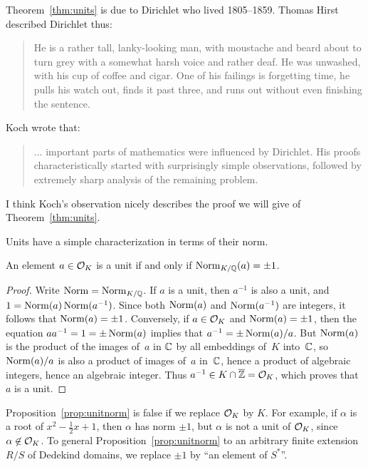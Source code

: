 \begin{remark}
Theorem~\ref{thm:units} is due to Dirichlet  who lived 1805--1859.
Thomas Hirst described Dirichlet thus:
\begin{quote}He is a rather tall,
lanky-looking man, with moustache and beard about
to turn grey with a somewhat harsh voice and rather deaf. He was
unwashed, with his cup of coffee and cigar. One of his failings is
forgetting time, he pulls his watch out, finds it past three, and runs
out without even finishing the sentence.
\end{quote}
Koch wrote that:
\begin{quote}
... important parts of mathematics were influenced by Dirichlet. His
proofs characteristically started with surprisingly simple
observations, followed by extremely sharp analysis of the remaining
problem.
\end{quote}
I think Koch's observation nicely describes the proof we will give of
Theorem~\ref{thm:units}.
\end{remark}



Units have a simple characterization in terms of their norm.
\begin{proposition}\label{prop:unitnorm}
An element $a\in \mathcal{O}_K$ is a unit if and only if $\operatorname{Norm}_{K/\mathbb{Q}}(a)=\pm 1$.
\end{proposition}
\begin{proof}
Write $\operatorname{Norm}=\operatorname{Norm}_{K/\mathbb{Q}}$.  If $a$ is a unit, then $a^{-1}$ is also a
unit, and $1=\operatorname{Norm}(a)\operatorname{Norm}(a^{-1})$.  Since both $\operatorname{Norm}(a)$ and
$\operatorname{Norm}(a^{-1})$ are integers, it follows that $\operatorname{Norm}(a)=\pm 1$.
Conversely, if $a\in \mathcal{O}_K$ and $\operatorname{Norm}(a)=\pm 1$, then the equation
$aa^{-1}=1=\pm \operatorname{Norm}(a)$ implies that $a^{-1} = \pm \operatorname{Norm}(a)/a$.  But
$\operatorname{Norm}(a)$ is the product of the images of~$a$ in $\mathbb{C}$ by all
embeddings of~$K$ into~$\mathbb{C}$, so $\operatorname{Norm}(a)/a$ is also a product of
images of~$a$ in~$\mathbb{C}$, hence a product of algebraic integers,
hence an algebraic integer.  Thus $a^{-1}\in K\cap \overline{\mathbb{Z}} = \mathcal{O}_K$,
which proves that~$a$ is a unit.
\end{proof}

\begin{remark}
Proposition~\ref{prop:unitnorm} is false if we replace $\mathcal{O}_K$ by $K$.
For example, if $\alpha$ is a root of $x^2-\frac{1}{2}x+1$, then
$\alpha$ has norm $\pm 1$, but $\alpha$ is not a unit of $\mathcal{O}_K$, since
$\alpha\not\in \mathcal{O}_K$.  To general Proposition~\ref{prop:unitnorm} to an
arbitrary finite extension $R/S$ of Dedekind domains, we replace $\pm
1$ by ``an element of $S^*$''.
\end{remark}

